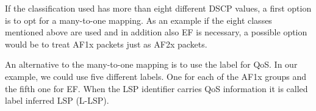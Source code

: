 If the classification used has more than eight different DSCP values, a first option is to opt for a many-to-one mapping.
As an example if the eight classes mentioned above are used and in addition also EF is necessary, a possible option would be to treat AF1x packets just as AF2x packets.

An alternative to the many-to-one mapping is to use the label for QoS.
In our example, we could use five different labels.
One for each of the AF1x groups and the fifth one for EF.
When the LSP identifier carries QoS information it is called label inferred LSP (L-LSP).

